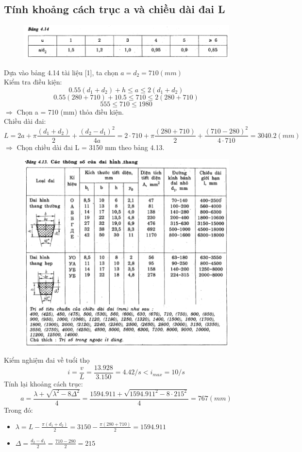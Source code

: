 \subsection{Tính khoảng cách trục a và chiều dài đai L}
\begin{figure}[H]
    \centering
    \includegraphics[width=1\textwidth]{pictures/bang4.14.png}
\end{figure}
Dựa vào bảng 4.14 tài liệu [1], ta chọn $a = d_2 = 710 (mm)$ \\
Kiểm tra điều kiện:
\[
    0.55(d_1 + d_2) + h \leq a \leq 2(d_1 + d_2)
\]
\[
    0.55(280 + 710) + 10.5 \leq 710 \leq 2(280 + 710)
\]
\[
    555 \leq 710 \leq 1980 
\]
$\Rightarrow$ Chọn a = 710 (mm) thỏa điều kiện. \\
Chiều dài đai: \\
\[
    L = 2a + \pi\frac{(d_1 + d_2)}{2} + \frac{(d_2 - d_1)^2}{4a} = 2 \cdot 710 + \pi\frac{(280 + 710)}{2} + \frac{(710 - 280)^2}{4 \cdot 710} =  3040.2(mm)
\]
$\Rightarrow$ Chọn chiều dài đai L = 3150 mm theo bảng 4.13. \\
\begin{figure}[H]
    \centering
    \includegraphics[width=1\textwidth]{pictures/bang4.13.png}
\end{figure}
Kiểm nghiệm đai về tuổi thọ
\[
    i = \frac{v}{L} = \frac{13.928}{3.150} = 4.42/s < i_{max} = 10/s
\]
Tính lại khoảng cách trục: 
\[
    a = \frac{\lambda + \sqrt{\lambda^2 - 8\Delta^2}}{4} = \frac{1594.911 + \sqrt{1594.911^2 - 8 \cdot 215^2}}{4} = 767 (mm)
\]
Trong đó:
\begin{itemize}
    \item $\lambda = L - \frac{\pi(d_1 + d_2)}{2} = 3150 - \frac{\pi(280+710)}{2} = 1594.911$ 
    \item $\Delta = \frac{d_2-d_1}{2} = \frac{710-280}{2} = 215$
\end{itemize}

